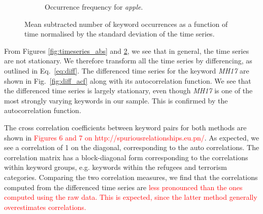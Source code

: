 \documentclass[12pt, a4paper]{article}
\begin{document}
\begin{figure}
\begin{subfigure}{.5\textwidth}
  \caption{Occurrence frequency for \textit{apple}.}
  \label{fig:sub23}
\end{subfigure}
\caption{Mean subtracted number of keyword occurrences as a function of time normalised by the standard deviation of the time series.}
\label{fig:timeseries_rel}
\end{figure}

From Figures \ref{fig:timeseries_abs} and \ref{fig:timeseries_rel}, we see that in general, the time series are not stationary. We therefore transform all the time series by differencing, as outlined in Eq.~\ref{eq:diff}. The differenced time series for the keyword \textit{MH17} are shown in Fig.~\ref{fig:diff_acf} along with its autocorrelation function. We see that the differenced time series is largely stationary, even though \textit{MH17} is one of the most strongly varying keywords in our sample. This is confirmed by the autocorrelation function.

The cross correlation coefficients between keyword pairs for both methods are shown in \textcolor{red}{Figures 6 and 7 on http://spuriousrelationships.eu.pn/}. As expected, we see a correlation of 1 on the diagonal, corresponding to the auto correlations. The correlation matrix has a block-diagonal form corresponding to the correlations within keyword groups, e.g. keywords within the refugees and terrorism categories. Comparing the two correlation measures, we find that the correlations computed from the differenced time series are \textcolor{red}{less pronounced than the ones computed using the raw data. This is expected, since the latter method generally overestimates correlations.} 
\end{document}

